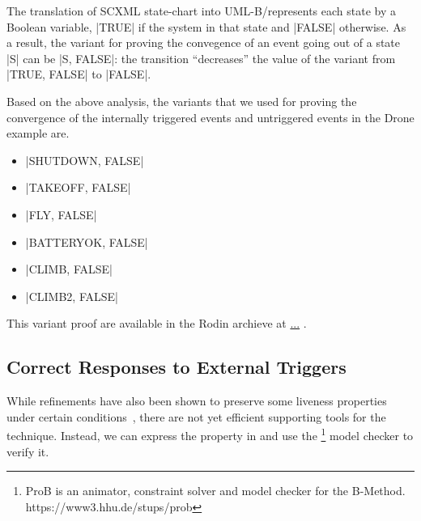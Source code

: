 The translation of SCXML state-chart into UML-B/\EventB represents each
state by a Boolean variable, |TRUE| if the system in that state and
|FALSE| otherwise. As a result, the variant for proving the convegence
of an event going out of a state |S| can be |{S, FALSE}|: the
transition ``decreases'' the value of the variant from |{TRUE, FALSE}|
to |FALSE|.

Based on the above analysis, the variants that we used for proving the
convergence of the internally triggered events and untriggered events
in the Drone example are.
\begin{itemize}
\item |{SHUTDOWN, FALSE}|

\item |{TAKEOFF, FALSE}|

\item |{FLY, FALSE}|

\item |{BATTERYOK, FALSE}|

\item |{CLIMB, FALSE}|

\item |{CLIMB2, FALSE}|
\end{itemize}

This variant proof are available in the Rodin archieve at \url{...}
.


\subsection{Correct Responses to External Triggers}
\label{sec:corr-resp-extern}

While \EventB refinements have also been shown to preserve some liveness properties under certain conditions~\cite{hoang2016ltl}, there are not yet efficient supporting tools for the technique.%
Instead, we can express the property in \LTL  and use the \PROB\footnote{ProB is an animator, constraint solver and model checker for the B-Method. https://www3.hhu.de/stups/prob} model checker to verify it.

